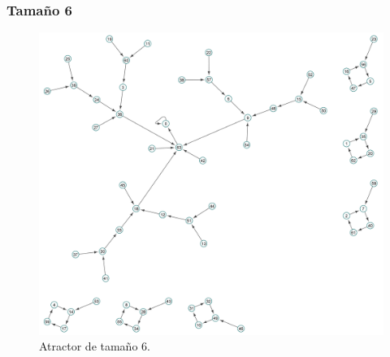 \documentclass[11pt]{article}
\begin{document}
			\subsubsection{Tamaño 6}
			\begin{figure}[H]
			\centering
			\includegraphics[scale=0.1]{resources/Atractores54/atractor_54_size_6.png}
			\caption{Atractor de tamaño 6.}\label{fig:picture}
			\end{figure}
\end{document}
